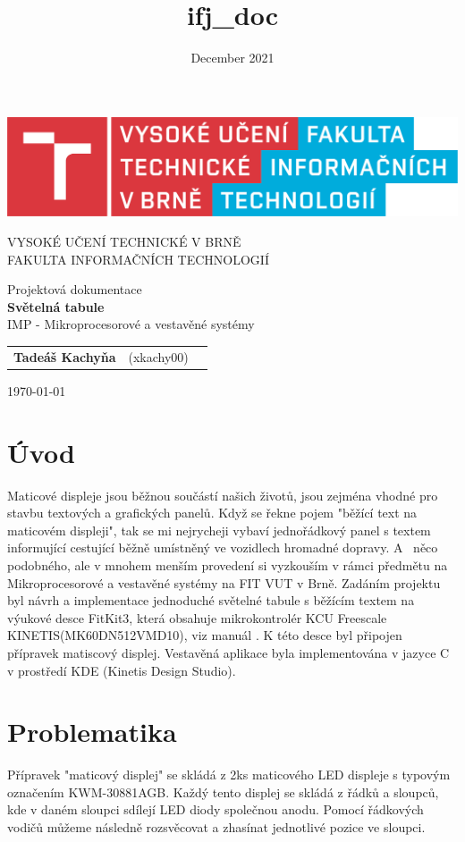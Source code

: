\documentclass[a4paper, 11pt]{article}
\title{ifj_doc}
\author{}
\date{December 2021}
\begin{document}
\begin{titlepage}
\begin{center}
\huge

\includegraphics[scale=0.8]{vutfitlogo.png}\vspace{2cm}

\textsc{\LARGE VYSOKÉ UČENÍ TECHNICKÉ V BRNĚ}\\
\Large FAKULTA INFORMAČNÍCH TECHNOLOGIÍ\vspace{4cm}


\LARGE Projektová dokumentace\\
\Large {\bf Světelná tabule}\\
\Large IMP - Mikroprocesorové a vestavěné systémy \\
\vspace{7cm}
\end{center}
\begin{tabular}{l c c}
    \textbf {Tadeáš Kachyňa} & (xkachy00) \\
\end{tabular}
     \hfill  \today
\end{titlepage}
\section{Úvod}
Maticové displeje jsou běžnou součástí našich životů, jsou zejména vhodné pro stavbu textových a grafických panelů. Když se řekne pojem "běžící text na maticovém displeji", tak se mi nejrycheji vybaví jednořádkový panel s textem informující cestující běžně umístněný ve vozidlech hromadné dopravy. A~ něco podobného, ale v mnohem menším provedení si vyzkouším v rámci předmětu na Mikroprocesorové a vestavěné systémy na FIT VUT v Brně. Zadáním projektu byl návrh a implementace jednoduché světelné tabule s běžícím textem na výukové desce FitKit3, která obsahuje mikrokontrolér KCU Freescale KINETIS(MK60DN512VMD10), viz manuál \cite{k60_manual}. K této desce byl připojen přípravek matiscový displej. Vestavěná aplikace byla implementována v jazyce C v prostředí KDE (Kinetis Design Studio).

\section{Problematika}
Přípravek "maticový displej" se skládá z 2ks maticového LED displeje s typovým 
označením KWM-30881AGB. Každý tento displej se skládá z řádků a sloupců, kde v daném sloupci sdílejí LED diody společnou anodu. Pomocí řádkových vodičů můžeme následně rozsvěcovat a zhasínat jednotlivé pozice ve sloupci.
\end{document}
